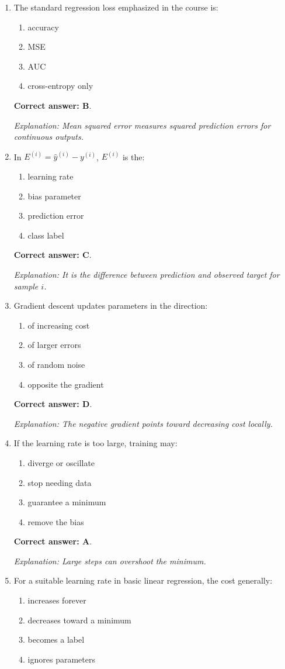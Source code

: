 \documentclass[10pt,a4paper]{article}
\newcommand{\ans}[1]{\par\textbf{Correct answer: #1}}
\newcommand{\expn}[1]{\par\textit{Explanation: #1}}
\begin{document}
\begin{enumerate}[label=\textbf{\arabic*.},itemsep=4pt]
\ans{A}. \expn{A linear model uses a weighted input plus an intercept.}
\item The standard regression loss emphasized in the course is:
\begin{enumerate}[label=\Alph*.,itemsep=0pt]\item accuracy\item MSE\item AUC\item cross-entropy only\end{enumerate}
\ans{B}. \expn{Mean squared error measures squared prediction errors for continuous outputs.}
\item In $E^{(i)}=\hat y^{(i)}-y^{(i)}$, $E^{(i)}$ is the:
\begin{enumerate}[label=\Alph*.,itemsep=0pt]\item learning rate\item bias parameter\item prediction error\item class label\end{enumerate}
\ans{C}. \expn{It is the difference between prediction and observed target for sample $i$.}
\item Gradient descent updates parameters in the direction:
\begin{enumerate}[label=\Alph*.,itemsep=0pt]\item of increasing cost\item of larger errors\item of random noise\item opposite the gradient\end{enumerate}
\ans{D}. \expn{The negative gradient points toward decreasing cost locally.}
\item If the learning rate is too large, training may:
\begin{enumerate}[label=\Alph*.,itemsep=0pt]\item diverge or oscillate\item stop needing data\item guarantee a minimum\item remove the bias\end{enumerate}
\ans{A}. \expn{Large steps can overshoot the minimum.}
\item For a suitable learning rate in basic linear regression, the cost generally:
\begin{enumerate}[label=\Alph*.,itemsep=0pt]\item increases forever\item decreases toward a minimum\item becomes a label\item ignores parameters\end{enumerate}

\end{enumerate}
\end{document}
